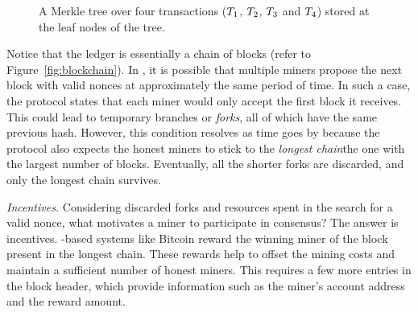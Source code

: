 \begin{figure}[t]\label{ex:merkle_tree}
       \centering
      	\caption{A Merkle tree over four transactions ($\Transaction_1$, $\Transaction_2$, 
      	$\Transaction_3$ and $\Transaction_4$) stored at the leaf nodes of the tree.}
	\label{fig:merkle-tree}
\end{figure} 


Notice that the ledger is essentially a chain of blocks (refer to Figure~\ref{fig:blockchain}).
In \PoW{}, it is possible that multiple miners propose the next block with valid 
nonces at approximately the same period of time. In such a case, the protocol states 
that each miner would only accept the first block it receives. This could lead to 
temporary branches or {\em forks}, all of which have the same previous hash. However, 
this condition resolves as time goes by because the protocol also expects the honest 
miners to stick to the {\em longest chain}\textemdash the one with the largest number 
of blocks. Eventually, all the shorter forks are discarded, and only the longest 
chain survives.

{\em Incentives.} 
Considering discarded forks and resources spent in the search for a valid nonce, 
what motivates a miner to participate in \PoW{} consensus? The answer is incentives. 
\PoW{}-based systems like Bitcoin reward the winning miner of the block present 
in the longest chain. These rewards help to offset the mining costs and maintain a  
sufficient number of honest miners. This requires a few more entries in the block header, 
which provide information such as the miner's account address and the reward amount.


